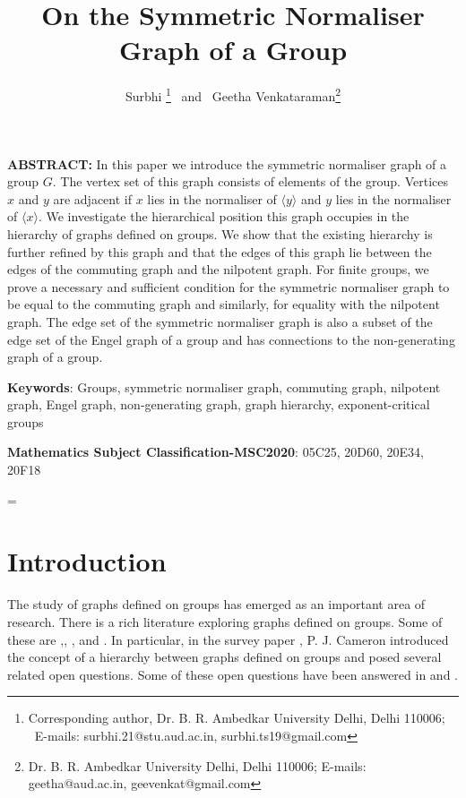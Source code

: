 \title{On the Symmetric Normaliser Graph of a Group}

\author{Surbhi \footnote{Corresponding author, Dr. B. R. Ambedkar University Delhi, Delhi 110006; \ E-mails: surbhi.21@stu.aud.ac.in, surbhi.ts19@gmail.com} \ and \ Geetha Venkataraman\footnote{Dr. B. R. Ambedkar University Delhi, Delhi 110006; E-mails: geetha@aud.ac.in, geevenkat@gmail.com}}

\date{}
\addtolength{\textwidth}{8pt}


\selectfont
\maketitle

\bigskip
\noindent
{\small{\bf ABSTRACT:}}
 In this paper we introduce the symmetric normaliser graph of a group $G$. The vertex set of this graph consists of elements of the group. Vertices $x$ and $y$ are adjacent if $x$ lies in the normaliser of $\langle y \rangle$ and $y$ lies in the normaliser of $\langle x \rangle$. We investigate the hierarchical position this graph occupies in the hierarchy of graphs defined on groups. We show that the existing hierarchy is further refined by this graph and that the edges of this graph lie between the edges of the commuting graph and the nilpotent graph. For finite groups, we prove a necessary and sufficient condition for the symmetric normaliser graph to be equal to the commuting graph and similarly, for equality with the nilpotent graph. The edge set of the symmetric normaliser graph is also a subset of the edge set of the Engel graph of a group and has connections to the non-generating graph of a group.

\medskip
\noindent
{\small{\bf Keywords}{:} }
Groups, symmetric normaliser graph, commuting graph, nilpotent graph, Engel graph, non-generating graph, graph hierarchy, exponent-critical groups 

\medskip
\noindent
{\small{\bf Mathematics Subject Classification-MSC2020}{:} }
05C25, 20D60, 20E34, 20F18

\baselineskip=\normalbaselineskip


\section{Introduction}
The study of graphs defined on groups has emerged as an important area of research. There is a rich literature exploring graphs defined on groups. Some of these are \cite {AA2007},\cite {AACNS2017}, \cite{PJC2022}, \cite{ADM2023} and \cite{DGLM2025}. In particular, in the survey paper \cite{PJC2022}, P. J. Cameron introduced the concept of a hierarchy between graphs defined on groups and posed several related open questions. Some of these open questions have been answered in \cite{SV2024_1} and \cite{SV2024_2}.


